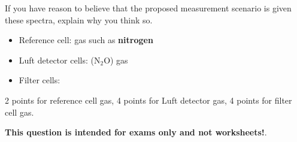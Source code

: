 \vskip 10pt

If you have reason to believe that the proposed measurement scenario is  given these spectra, explain why you think so.







\begin{itemize}
\item{} Reference cell:  gas such as {\bf nitrogen}
\vskip 5pt
\item{} Luft detector cells:  (N$_{2}$O) gas
\vskip 5pt
\item{} Filter cells: 
\end{itemize}

2 points for reference cell gas, 4 points for Luft detector gas, 4 points for filter cell gas.







{\bf This question is intended for exams only and not worksheets!}.




